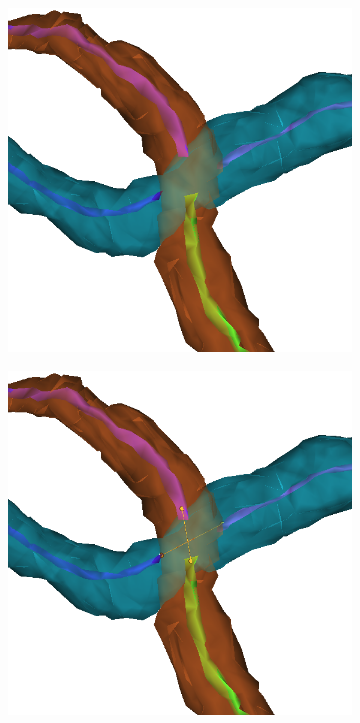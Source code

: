 \begin{figure}[htpb]
\begin{subfigure}[b]{0.24\textwidth}
		\caption{\label{fig:splitNMatchB}}
	\end{subfigure}
	\hfill
	\begin{subfigure}[b]{0.24\textwidth}
		\centering
		\includegraphics[width=\textwidth]{data/images/splitNMatch/split.png}
		\caption{\label{fig:splitNMatchC}}
	\end{subfigure}
	\hfill
	\begin{subfigure}[b]{0.24\textwidth}
		\centering
		\includegraphics[width=\textwidth]{data/images/splitNMatch/matched.png}

\end{subfigure}
\end{figure}
